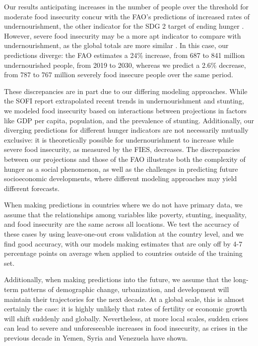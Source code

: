 \documentclass[titlepage]{article}
\begin{document}
Our results anticipating increases in the number of people over the threshold for moderate food insecurity concur with the FAO's predictions of increased rates of undernourishment, the other indicator for the SDG 2 target of ending hunger \citep[Part 1, Page 11]{sofi2020}.  However, severe food insecurity may be a more apt indicator to compare with undernourishment, as the global totals are more similar \citep{sofi2020}.  In this case, our predictions diverge: the FAO estimates a 24\% increase, from 687 to 841 million undernourished people, from 2019 to 2030, whereas we predict a 2.6\% decrease, from 787 to 767 million severely food insecure people over the same period.

These discrepancies are in part due to our differing modeling approaches. While the SOFI report extrapolated recent trends in undernourishment and stunting, we modeled food insecurity based on interactions between projections in factors like GDP per capita, population, and the prevalence of stunting. Additionally, our diverging predictions for different hunger indicators are not necessarily mutually exclusive: it is theoretically possible for undernourishment to increase while severe food insecurity, as measured by the FIES, decreases.  The discrepancies between our projections and those of the FAO illustrate both the complexity of hunger as a social phenomenon, as well as the challenges in predicting future socioeconomic developments, where different modeling approaches may yield different forecasts.

When making predictions in countries where we do not have primary data, we assume that the relationships among variables like poverty, stunting, inequality, and food insecurity are the same across all locations.  We test the accuracy of these cases by using leave-one-out cross validation at the country level, and we find good accuracy, with our models making estimates that are only off by 4-7 percentage points on average when applied to countries outside of the training set. 

Additionally, when making predictions into the future, we assume that the long-term patterns of demographic change, urbanization, and development will maintain their trajectories for the next decade.  At a global scale, this is almost certainly the case: it is highly unlikely that rates of fertility or economic growth will shift suddenly and globally.  Nevertheless, at more local scales, sudden crises can lead to severe and unforeseeable increases in food insecurity, as crises in the previous decade in Yemen, Syria and Venezuela have shown.
\end{document}
